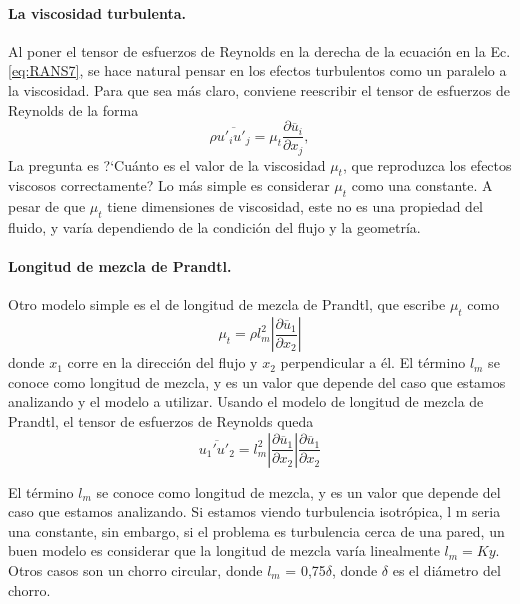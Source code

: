 \paragraph*{La viscosidad turbulenta.}
Al poner el tensor de esfuerzos de Reynolds en la derecha de la ecuación en la Ec. \eqref{eq:RANS7}, se hace natural pensar en los efectos turbulentos como un paralelo a la viscosidad.
Para que sea más claro, conviene reescribir el tensor de esfuerzos de Reynolds de la forma
%
\begin{equation}
\rho\overline{u'_iu'_j}=\mu_t\frac{\partial \overline{u}_i}{\partial x_j}, 
\end{equation}
%
La pregunta es \mbox{?`}Cuánto es el valor de la viscosidad $\mu_t$, que reproduzca los efectos viscosos correctamente?
Lo más simple es considerar $\mu_t$ como una constante.
A pesar de que $\mu_t$ tiene dimensiones de viscosidad, este no es una propiedad del fluido, y varía dependiendo de la condición del flujo y la geometría.

\paragraph*{Longitud de mezcla de Prandtl.} Otro modelo simple es el de longitud de mezcla de Prandtl, que escribe $\mu_t$ como
%
\begin{equation}
\mu_t = \rho l_m^2\left|\frac{\partial \overline{u}_1}{\partial x_2}\right|
\end{equation}
%
donde $x_1$ corre en la dirección del flujo y $x_2$ perpendicular a él.
El término $l_m$ se conoce como longitud de mezcla, y es un valor que depende del caso que estamos analizando y el modelo a utilizar.
Usando el modelo de longitud de mezcla de Prandtl, el tensor de esfuerzos de Reynolds queda
%
\begin{equation}
\overline{u_1'u'_2} = l_m^2\left|\frac{\partial \overline{u}_1}{\partial x_2}\right|\frac{\partial \overline{u}_1}{\partial x_2}
\end{equation}

El término $l_m$ se conoce como longitud de mezcla, y es un valor que depende del caso que estamos analizando. 
Si estamos viendo turbulencia isotrópica, l m seria una constante, sin embargo, si el problema es turbulencia cerca de una pared, un buen modelo es considerar que la longitud de mezcla varía linealmente $l_m = Ky$. 
Otros casos son un chorro circular, donde $l_m$ = 0,75$\delta$, donde $\delta$ es el diámetro del chorro.

